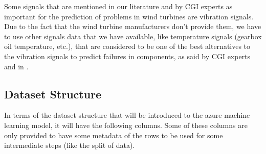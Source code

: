 
Some signals that are mentioned in our literature and by CGI experts as important for the prediction of problems in wind turbines are vibration signals. Due to the fact that the wind turbine manufacturers don't provide them, we have to use other signals data that we have available, like temperature signals (gearbox oil temperature, etc.), that are considered to be one of the best alternatives to the vibration signals to predict failures in components, as said by CGI experts and in \cite{OLD_19_WIND}.


\subsection{Dataset Structure} 
\label{sub:if_you_use_this_template} 

In terms of the dataset structure that will be introduced to the azure machine learning model, it will have the following columns. Some of these columns are only provided to have some metadata of the rows to be used for some intermediate steps (like the split of data).

